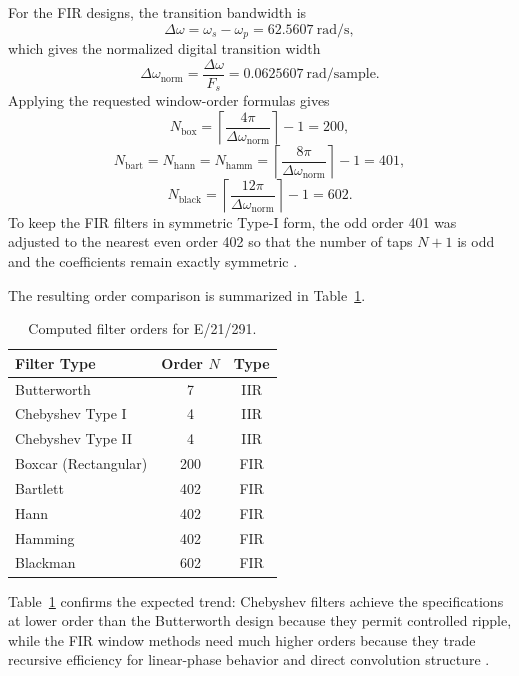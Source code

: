 \documentclass[12pt, a4paper]{article}
\begin{document}
For the FIR designs, the transition bandwidth is
\begin{equation}
\Delta \omega = \omega_s - \omega_p = 62.5607\ \text{rad/s},
\end{equation}
which gives the normalized digital transition width
\begin{equation}
\Delta \omega_{\mathrm{norm}} = \frac{\Delta \omega}{F_s} = 0.0625607\ \text{rad/sample}.
\end{equation}
Applying the requested window-order formulas gives
\begin{equation}
N_{\mathrm{box}} = \left\lceil \frac{4\pi}{\Delta \omega_{\mathrm{norm}}} \right\rceil - 1 = 200,
\end{equation}
\begin{equation}
N_{\mathrm{bart}} = N_{\mathrm{hann}} = N_{\mathrm{hamm}} = \left\lceil \frac{8\pi}{\Delta \omega_{\mathrm{norm}}} \right\rceil - 1 = 401,
\end{equation}
\begin{equation}
N_{\mathrm{black}} = \left\lceil \frac{12\pi}{\Delta \omega_{\mathrm{norm}}} \right\rceil - 1 = 602.
\end{equation}
To keep the FIR filters in symmetric Type-I form, the odd order 401 was adjusted to the nearest even order 402 so that the number of taps $N+1$ is odd and the coefficients remain exactly symmetric \cite{mitra2011, harris1978}.

The resulting order comparison is summarized in Table~\ref{tab:orders}.
\begin{table}[H]
  \centering
  \caption{Computed filter orders for E/21/291.}
  \label{tab:orders}
  \begin{tabular}{lcc}
    \toprule
    Filter Type & Order $N$ & Type \\
    \midrule
    Butterworth & 7 & IIR \\
    Chebyshev Type I & 4 & IIR \\
    Chebyshev Type II & 4 & IIR \\
    Boxcar (Rectangular) & 200 & FIR \\
    Bartlett & 402 & FIR \\
    Hann & 402 & FIR \\
    Hamming & 402 & FIR \\
    Blackman & 602 & FIR \\
    \bottomrule
  \end{tabular}
\end{table}

Table~\ref{tab:orders} confirms the expected trend: Chebyshev filters achieve the specifications at lower order than the Butterworth design because they permit controlled ripple, while the FIR window methods need much higher orders because they trade recursive efficiency for linear-phase behavior and direct convolution structure \cite{rabiner1975, parks1987, harris1978}.
\end{document}
